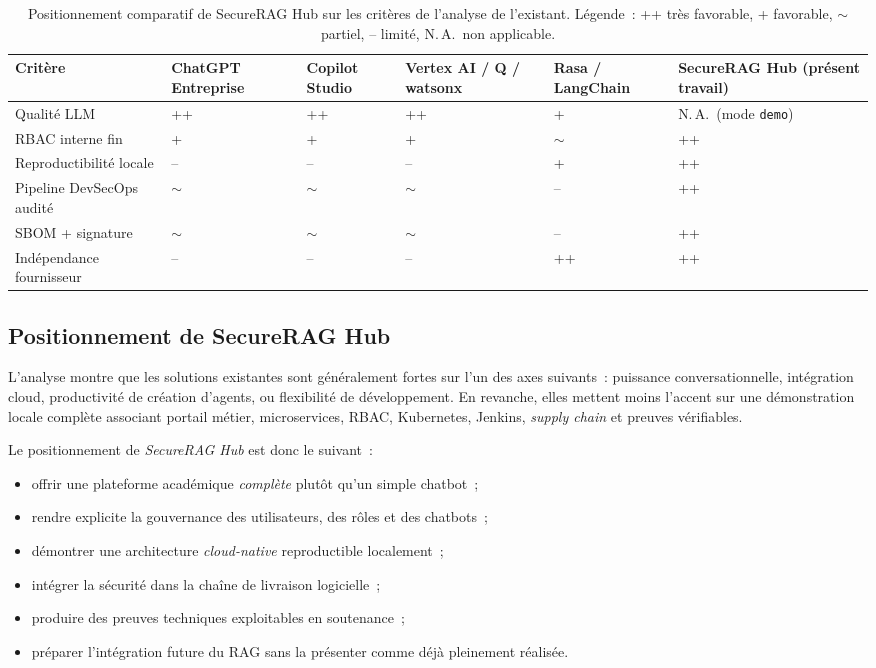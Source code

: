 \begin{table}[htbp]
    \centering
    \small
    \begin{tabular}{|p{3.4cm}|p{1.6cm}|p{1.8cm}|p{1.8cm}|p{1.8cm}|p{2.6cm}|}
        \hline
        \textbf{Critère} & \textbf{ChatGPT Entreprise} & \textbf{Copilot Studio} & \textbf{Vertex AI / Q / watsonx} & \textbf{Rasa / LangChain} & \textbf{SecureRAG Hub (présent travail)} \\
        \hline
        Qualité LLM & ++ & ++ & ++ & + & N.\,A.\ (mode \texttt{demo}) \\
        \hline
        RBAC interne fin & + & + & + & $\sim$ & ++ \\
        \hline
        Reproductibilité locale & -- & -- & -- & + & ++ \\
        \hline
        Pipeline DevSecOps audité & $\sim$ & $\sim$ & $\sim$ & -- & ++ \\
        \hline
        SBOM + signature & $\sim$ & $\sim$ & $\sim$ & -- & ++ \\
        \hline
        Indépendance fournisseur & -- & -- & -- & ++ & ++ \\
        \hline
    \end{tabular}
    \caption{Positionnement comparatif de SecureRAG Hub sur les critères de l'analyse de l'existant. Légende~: ++ très favorable, + favorable, $\sim$ partiel, -- limité, N.\,A.\ non applicable.}
    \label{tab:comparatif_existant}
\end{table}

\subsection{Positionnement de SecureRAG Hub}

L'analyse montre que les solutions existantes sont généralement fortes sur l'un des axes suivants~: puissance conversationnelle, intégration cloud, productivité de création d'agents, ou flexibilité de développement. En revanche, elles mettent moins l'accent sur une démonstration locale complète associant portail métier, microservices, RBAC, Kubernetes, Jenkins, \textit{supply chain} et preuves vérifiables.

Le positionnement de \textit{SecureRAG Hub} est donc le suivant~:
\begin{itemize}
    \item offrir une plateforme académique \textit{complète} plutôt qu'un simple chatbot~;
    \item rendre explicite la gouvernance des utilisateurs, des rôles et des chatbots~;
    \item démontrer une architecture \textit{cloud-native} reproductible localement~;
    \item intégrer la sécurité dans la chaîne de livraison logicielle~;
    \item produire des preuves techniques exploitables en soutenance~;
    \item préparer l'intégration future du RAG sans la présenter comme déjà pleinement réalisée.
\end{itemize}

